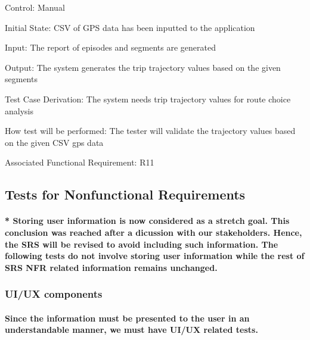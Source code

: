 \documentclass[12pt, titlepage]{article}
\begin{document}
\begin{enumerate}
Control: Manual
					
Initial State: CSV of GPS data has been inputted to the application 
					
Input: The report of episodes and segments are generated
					
Output: The system generates the trip trajectory values based on the given segments

Test Case Derivation: The system needs trip trajectory values for route choice analysis

How test will be performed: The tester will validate the trajectory values based on the given CSV gps data 

Associated Functional Requirement: R11


\end{enumerate}



\subsection{Tests for Nonfunctional Requirements}

\paragraph{* Storing user information is now considered as a stretch goal. This conclusion was reached after a dicussion with our stakeholders. Hence, the SRS will be revised to avoid including such information. The following tests do not involve storing user information while the rest of SRS NFR related information remains unchanged. }
\subsubsection{UI/UX components}
\paragraph{Since the information must be presented to the user in an understandable manner, we must have UI/UX related tests.}
\end{document}

